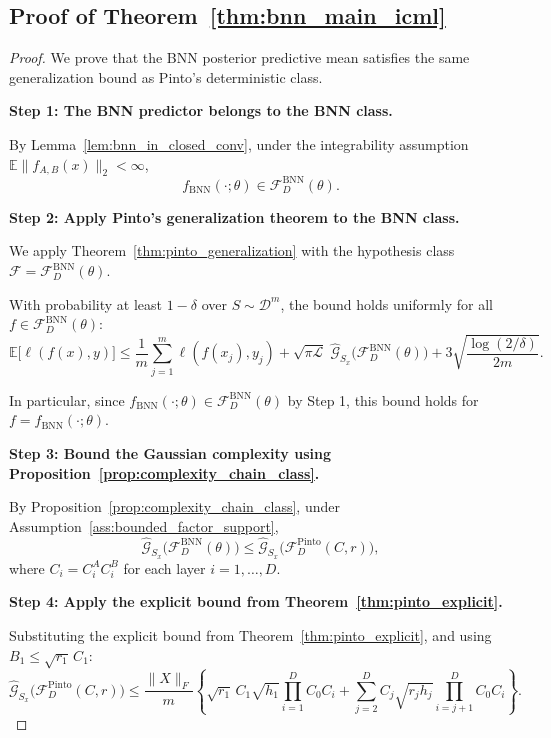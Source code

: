 \documentclass{article}
\theoremstyle{plain}
\theoremstyle{definition}
\theoremstyle{remark}
\begin{document}
\subsection{Proof of Theorem~\ref{thm:bnn_main_icml}}\label{app:gaussian_complexity:proof_main}

\begin{proof}
We prove that the BNN posterior predictive mean satisfies the same generalization bound as Pinto's deterministic class.

\textbf{Step 1: The BNN predictor belongs to the BNN class.}

By Lemma~\ref{lem:bnn_in_closed_conv}, under the integrability assumption $\mathbb{E}\|f_{A,B}(x)\|_2<\infty$,
\[
f_{\mathrm{BNN}}(\cdot;\theta)\in \mathcal{F}^{\mathrm{BNN}}_D(\theta).
\]

\textbf{Step 2: Apply Pinto's generalization theorem to the BNN class.}

We apply Theorem~\ref{thm:pinto_generalization} with the hypothesis class $\mathcal{F}=\mathcal{F}^{\mathrm{BNN}}_D(\theta)$.

With probability at least $1-\delta$ over $S\sim\mathcal{D}^m$, the bound holds uniformly for all $f\in\mathcal{F}^{\mathrm{BNN}}_D(\theta)$:
\[
\mathbb{E}\big[\ell(f(x),y)\big]
\le
\frac{1}{m}\sum_{j=1}^m \ell(f(x_j),y_j)
+
\sqrt{\pi\mathcal{L}}\;\hat{\mathcal{G}}_{S_x}\big(\mathcal{F}^{\mathrm{BNN}}_D(\theta)\big)
+
3\sqrt{\frac{\log(2/\delta)}{2m}}.
\]

In particular, since $f_{\mathrm{BNN}}(\cdot;\theta)\in\mathcal{F}^{\mathrm{BNN}}_D(\theta)$ by Step 1, this bound holds for $f=f_{\mathrm{BNN}}(\cdot;\theta)$.

\textbf{Step 3: Bound the Gaussian complexity using Proposition~\ref{prop:complexity_chain_class}.}

By Proposition~\ref{prop:complexity_chain_class}, under Assumption~\ref{ass:bounded_factor_support},
\[
\hat{\mathcal{G}}_{S_x}\big(\mathcal{F}^{\mathrm{BNN}}_D(\theta)\big)
\le
\hat{\mathcal{G}}_{S_x}\big(\mathcal{F}^{\mathrm{Pinto}}_D(C,r)\big),
\]
where $C_i = C_i^A C_i^B$ for each layer $i=1,\ldots,D$.

\textbf{Step 4: Apply the explicit bound from Theorem~\ref{thm:pinto_explicit}.}

Substituting the explicit bound from Theorem~\ref{thm:pinto_explicit}, and using $B_1 \le \sqrt{r_1}\,C_1$:
\[
\hat{\mathcal{G}}_{S_x}\big(\mathcal{F}^{\mathrm{Pinto}}_D(C,r)\big)
\le
\frac{\|X\|_F}{m}
\left\{
\sqrt{r_1}\,C_1\sqrt{h_1}\prod_{i=1}^D C_0 C_i
+
\sum_{j=2}^D C_j\sqrt{r_j h_j}\prod_{i=j+1}^D C_0 C_i
\right\}.
\]


\end{proof}
\end{document}
